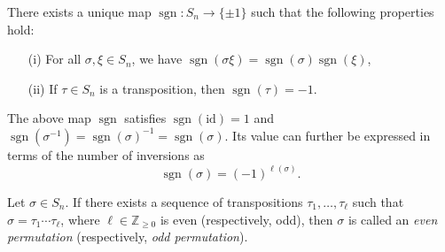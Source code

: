 \begin{proposition}
There exists a unique map $\operatorname{sgn} : S_n \to \{\pm 1\}$ such that the following properties hold:
\begin{itemize}
    \item[(i)] For all $\sigma, \xi \in S_n$, we have $\operatorname{sgn}(\sigma\xi) = \operatorname{sgn}(\sigma)\operatorname{sgn}(\xi)$,
    \item[(ii)] If $\tau \in S_n$ is a transposition, then $\operatorname{sgn}(\tau) = -1$.
\end{itemize}
The above map $\operatorname{sgn}$ satisfies $\operatorname{sgn}(\mathrm{id}) = 1$ and $\operatorname{sgn}(\sigma^{-1}) = \operatorname{sgn}(\sigma)^{-1} = \operatorname{sgn}(\sigma)$. Its value can further be expressed in terms of the number of inversions as
\[
\operatorname{sgn}(\sigma) = (-1)^{\ell(\sigma)}.
\]
\end{proposition}

\begin{definition}
Let $\sigma \in S_n$. If there exists a sequence of transpositions $\tau_1, \ldots, \tau_\ell$ such that $\sigma = \tau_1 \cdots \tau_\ell$, where $\ell \in \mathbb{Z}_{\geq 0}$ is even (respectively, odd), then $\sigma$ is called an \emph{even permutation} (respectively, \emph{odd permutation}).
\end{definition}
